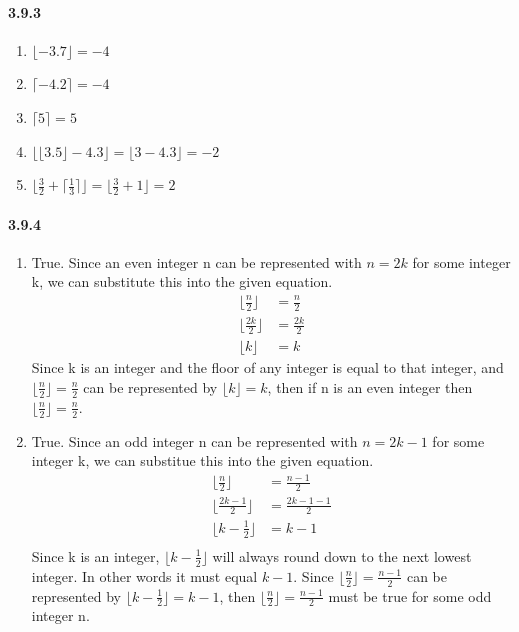 \documentclass[11pt, letterpaper, twocolumn, fleqn]{article}
\begin{document}
    \paragraph{3.9.3}
    \renewcommand{\labelenumi}{\alph{enumi}.}
    \begin{enumerate}
        \item $\lfloor -3.7 \rfloor = -4$
        \item $\lceil -4.2 \rceil = -4$
        \item $\lceil 5 \rceil = 5$
        \item $\lfloor \lfloor 3.5 \rfloor - 4.3\rfloor = \lfloor 3 - 4.3 \rfloor = -2 $
        \item $\lfloor \frac{3}{2} + \lceil \frac{1}{3} \rceil \rfloor = \lfloor \frac{3}{2} + 1 \rfloor = 2$
    \end{enumerate}
    
    \paragraph{3.9.4}
    \renewcommand{\labelenumi}{\alph{enumi}.}
    \begin{enumerate}
        \item 
            True. Since an even integer n can be represented with $n = 2k$ for some integer k, we can substitute this into the given equation. 
            \begin{align*}
                \lfloor \frac{n}{2} \rfloor &= \frac{n}{2} \\
                \lfloor \frac{2k}{2} \rfloor &= \frac{2k}{2} \\
                \lfloor k \rfloor &= k
            \end{align*}
            Since k is an integer and the floor of any integer is equal to that integer, and $\lfloor \frac{n}{2} \rfloor = \frac{n}{2}$ can be represented by $\lfloor k \rfloor = k$, then if n is an even integer then $\lfloor \frac{n}{2} \rfloor = \frac{n}{2}$.
        \item 
            True. Since an odd integer n can be represented with $n = 2k-1$ for some integer k, we can substitue this into the given equation.
            \begin{align*}
                \lfloor \frac{n}{2} \rfloor     &= \frac{n-1}{2} \\
                \lfloor \frac{2k-1}{2} \rfloor  &= \frac{2k-1-1}{2} \\
                \lfloor k - \frac{1}{2} \rfloor &= k-1 \\
            \end{align*}
            Since k is an integer, $\lfloor k - \frac{1}{2} \rfloor$ will always round down to the next lowest integer. In other words it must equal $k-1$. Since $\lfloor \frac{n}{2} \rfloor = \frac{n-1}{2}$ can be represented by $\lfloor k - \frac{1}{2} \rfloor = k-1$, then $\lfloor \frac{n}{2} \rfloor = \frac{n-1}{2}$ must be true for some odd integer n.
    \end{enumerate}
    
\end{document}
